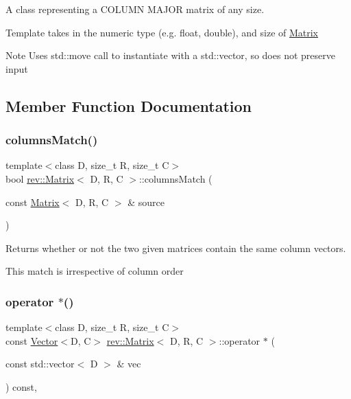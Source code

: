 A class representing a C\+O\+L\+U\+MN M\+A\+J\+OR matrix of any size. 

Template takes in the numeric type (e.\+g. float, double), and size of \mbox{\hyperlink{classrev_1_1_matrix}{Matrix}} \begin{DoxyNote}{Note}
Uses std\+::move call to instantiate with a std\+::vector, so does not preserve input 
\end{DoxyNote}


\subsection{Member Function Documentation}
\mbox{\label{classrev_1_1_matrix_a323a777d775cc672a918ee57efbba10d}} 
\subsubsection{\texorpdfstring{columnsMatch()}{columnsMatch()}}
{\footnotesize\ttfamily template$<$class D, size\+\_\+t R, size\+\_\+t C$>$ \\
bool \mbox{\hyperlink{classrev_1_1_matrix}{rev\+::\+Matrix}}$<$ D, R, C $>$\+::columns\+Match (\begin{DoxyParamCaption}\item[{const \mbox{\hyperlink{classrev_1_1_matrix}{Matrix}}$<$ D, R, C $>$ \&}]{source }\end{DoxyParamCaption})\hspace{0.3cm}{\ttfamily [inline]}}



Returns whether or not the two given matrices contain the same column vectors. 

This match is irrespective of column order \mbox{\label{classrev_1_1_matrix_a1b1a8827bda6414891c3cf29500119da}} 
\subsubsection{\texorpdfstring{operator $\ast$()}{operator *()}}
{\footnotesize\ttfamily template$<$class D, size\+\_\+t R, size\+\_\+t C$>$ \\
const \mbox{\hyperlink{classrev_1_1_vector}{Vector}}$<$D, C$>$ \mbox{\hyperlink{classrev_1_1_matrix}{rev\+::\+Matrix}}$<$ D, R, C $>$\+::operator $\ast$ (\begin{DoxyParamCaption}\item[{const std\+::vector$<$ D $>$ \&}]{vec }\end{DoxyParamCaption}) const\hspace{0.3cm}{\ttfamily [inline]}, {\ttfamily [protected]}}



